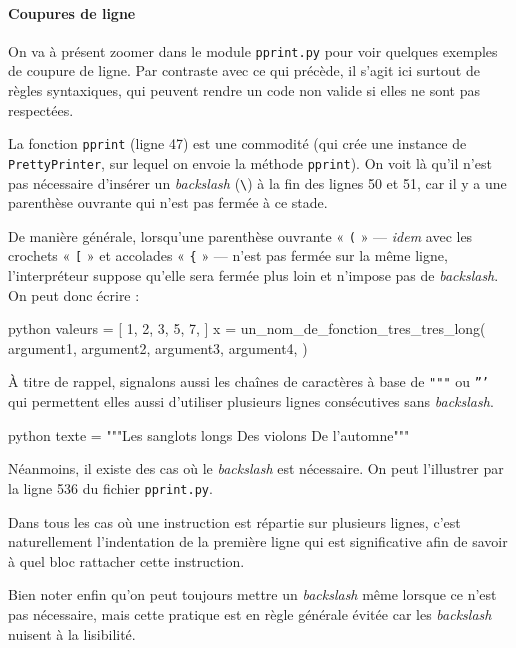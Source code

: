 \paragraph*{Coupures de ligne}
On va à présent zoomer dans le module \texttt{pprint.py} pour voir quelques exemples de coupure de ligne. Par con\-traste avec ce qui précède, il s'agit ici surtout de règles syntaxiques, qui peuvent rendre un code non valide si elles ne sont pas respectées.

La fonction \texttt{pprint} (ligne 47) est une commodité (qui crée une instance de \texttt{PrettyPrinter}, sur lequel on envoie la méthode \texttt{pprint}). On voit là qu'il n'est pas nécessaire d'insérer un \textit{backslash} (\texttt{\textbackslash}) à la fin des lignes 50 et 51, car il y a une parenthèse ouvrante qui n'est pas fermée à ce stade.

De manière générale, lorsqu'une parenthèse ouvrante « \texttt{(} » --- \textit{idem} avec les crochets « \texttt{[} » et accolades « \texttt{\{} » --- n'est pas fermée sur la même ligne, l'interpréteur suppose qu'elle sera fermée plus loin et n'impose pas de \textit{backslash}.
On peut donc écrire :

\begin{codebox}{python}
valeurs = [ 
   1,
   2,
   3,
   5,
   7,
]
x = un_nom_de_fonction_tres_tres_long(
       argument1, argument2,
       argument3, argument4,
    )
\end{codebox}

À titre de rappel, signalons aussi les chaînes de caractères à base de \texttt{"""} ou \texttt{'''} qui permettent elles aussi d'utiliser plusieurs lignes consécutives sans \textit{backslash}.

\begin{codebox}{python}
texte = """Les sanglots longs
Des violons
De l'automne"""
\end{codebox}

Néanmoins, il existe des cas où le \textit{backslash} est nécessaire. On peut l'illustrer par la ligne 536 du fichier \texttt{pprint.py}.

Dans tous les cas où une instruction est répartie sur plusieurs lignes, c'est naturellement l'indentation de la première ligne qui est significative afin de savoir à quel bloc rattacher cette instruction.

Bien noter enfin qu'on peut toujours mettre un \textit{backslash} même lorsque ce n'est pas nécessaire, mais cette pratique est en règle générale évitée car les \textit{backslash} nuisent à la lisibilité.

